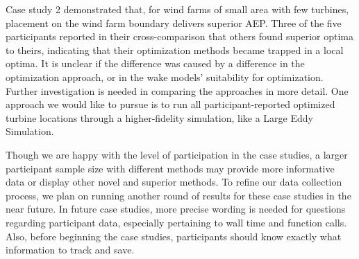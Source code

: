 Case study 2 demonstrated that, for wind farms of small area with few turbines, placement on the wind farm boundary delivers superior AEP.
Three of the five participants reported in their cross-comparison that others found superior optima to theirs, indicating that their optimization methods became trapped in a local optima.
It is unclear if the difference was caused by a difference in the optimization approach, or in the wake models' suitability for optimization.  Further investigation is needed in comparing the approaches in more detail.  One approach we would like to pursue is to run all participant-reported optimized turbine locations through a higher-fidelity simulation, like a Large Eddy Simulation.  



Though we are happy with the level of participation in the case studies, a larger participant sample size with different methods may provide more informative data or display other novel and superior methods.
To refine our data collection process, we plan on running another round of results for these case studies in the near future.  In future case studies, more precise wording is needed for questions regarding participant data, especially pertaining to wall time and function calls.  Also, before beginning the case studies, participants should know exactly what information to track and save.


